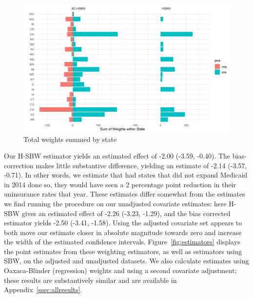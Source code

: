 \documentclass[12pt]{article}
\begin{document}
\begin{figure}[B]
\begin{center}
    \includegraphics[scale=0.6]{01_Plots/weights-by-state-main.png}
    \caption{Total weights summed by state}
    \label{fig:statewghts}
\end{center}
\end{figure}

Our H-SBW estimator yields an estimated effect of -2.00 (-3.59, -0.40). The bias-correction makes little substantive difference, yielding an estimate of -2.14 (-3.57, -0.71). In other words, we estimate that had states that did not expand Medicaid in 2014 done so, they would have seen a 2 percentage point reduction in their uninsurance rates that year. These estimates differ somewhat from the estimates we find running the procedure on our unadjusted covariate estimates: here H-SBW gives an estimated effect of -2.26 (-3.23, -1.29), and the bias corrected estimator yields -2.50 (-3.41, -1.58). Using the adjusted covariate set appears to both move our estimate closer in absolute magnitude towards zero and increase the width of the estimated confidence intervals. Figure~\ref{fig:estimators} displays the point estimates from these weighting estimators, as well as estimators using SBW, on the adjusted and unadjusted datasets. We also calculate estimates using Oaxaca-Blinder (regression) weights and using a second covariate adjustment; these results are substantively similar and are available in Appendix~\ref{ssec:allresults}. 
\end{document}
